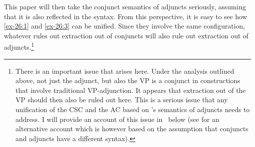 \documentclass[output=paper]{langsci/langscibook}
\begin{document}
This paper will then take the conjunct semantics of adjuncts seriously,
assuming that it is also reflected in the syntax. From this perspective, it is
easy to see how \eqref{ex-26:1} and \eqref{ex-26:3} can be unified. Since they involve the same
configuration, whatever rules out extraction out of conjuncts will also rule
out extraction out of adjuncts.\footnote{There is an important issue that
    arises here. Under the analysis outlined above, not just the adjunct, but
    also the VP is a conjunct in constructions that involve traditional
    VP-adjunction.  It appears that extraction out of the VP should then also
    be ruled out here.  This is a serious issue that any unification of the
    \gls{CSC} and the \glsdesc{AC} based on \citeauthor{Higginbotham1985}’s
    semantics of adjuncts needs to address. I will provide an account of this
    issue in~ below (see \citealt{Takahashi1994} for an
alternative account which is however based on the assumption that conjuncts and
adjuncts have a different syntax).}
\end{document}
